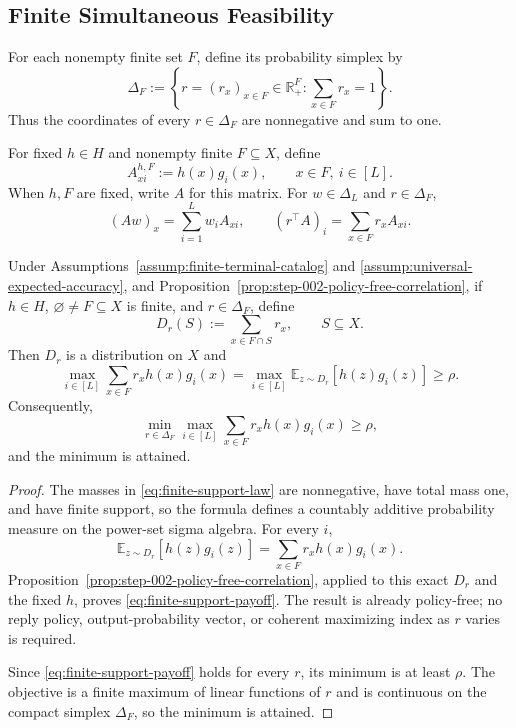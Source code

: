 \subsection{Finite Simultaneous Feasibility}
\label{app:finite-simultaneous-feasibility}

For each nonempty finite set $F$, define its probability simplex by
\[
\Delta_F:=\left\{r=(r_x)_{x\in F}\in\mathbb R_+^F:
\sum_{x\in F}r_x=1\right\}.
\]
Thus the coordinates of every $r\in\Delta_F$ are nonnegative and sum to one.

For fixed $h\in H$ and nonempty finite $F\subseteq X$, define
\begin{equation}\label{eq:finite-payoff-matrix}
A^{h,F}_{xi}:=h(x)g_i(x),\qquad x\in F,\ i\in[L].
\end{equation}
When $h,F$ are fixed, write $A$ for this matrix.  For
$w\in\Delta_L$ and $r\in\Delta_F$,
\[
(Aw)_x=\sum_{i=1}^Lw_iA_{xi},\qquad
(r^\top A)_i=\sum_{x\in F}r_xA_{xi}.
\]

\begin{lemma}
\label{lem:step-003-finite-support-payoff}
Under Assumptions~\ref{assump:finite-terminal-catalog} and
\ref{assump:universal-expected-accuracy}, and
Proposition~\ref{prop:step-002-policy-free-correlation}, if $h\in H$,
$\varnothing\ne F\subseteq X$ is finite, and $r\in\Delta_F$, define
\begin{equation}\label{eq:finite-support-law}
D_r(S):=\sum_{x\in F\cap S}r_x,\qquad S\subseteq X.
\end{equation}
Then $D_r$ is a distribution on $X$ and
\begin{equation}\label{eq:finite-support-payoff}
\max_{i\in[L]}\sum_{x\in F}r_xh(x)g_i(x)
=\max_{i\in[L]}\mathbb E_{z\sim D_r}[h(z)g_i(z)]
\ge\rho.
\end{equation}
Consequently,
\begin{equation}\label{eq:finite-row-value}
\min_{r\in\Delta_F}\max_{i\in[L]}
\sum_{x\in F}r_xh(x)g_i(x)\ge\rho,
\end{equation}
and the minimum is attained.
\end{lemma}

\begin{proof}
The masses in \eqref{eq:finite-support-law} are nonnegative, have total mass
one, and have finite support, so the formula defines a countably additive
probability measure on the power-set sigma algebra.  For every $i$,
\[
\mathbb E_{z\sim D_r}[h(z)g_i(z)]
=\sum_{x\in F}r_xh(x)g_i(x).
\]
Proposition~\ref{prop:step-002-policy-free-correlation}, applied to this exact
$D_r$ and the fixed $h$, proves \eqref{eq:finite-support-payoff}.  The result
is already policy-free; no reply policy, output-probability vector, or
coherent maximizing index as $r$ varies is required.

Since \eqref{eq:finite-support-payoff} holds for every $r$, its minimum is at
least $\rho$.  The objective is a finite maximum of linear functions of $r$
and is continuous on the compact simplex $\Delta_F$, so the minimum is
attained.
\end{proof}

